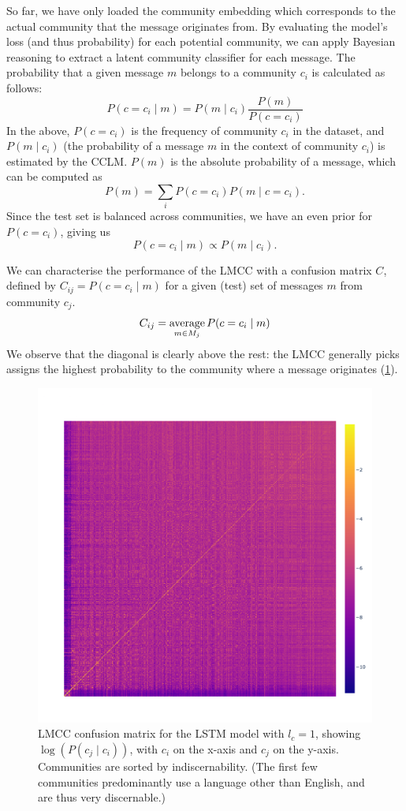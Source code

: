 \documentclass[11pt]{article}
\begin{document}
So far, we have only loaded the community embedding which corresponds
to the actual community that the message originates from. By
evaluating the model's loss (and thus probability) for each potential community,
we can apply Bayesian reasoning to extract a latent community classifier for each message.
The probability that a given message $m$
belongs to a community $c_i$ is calculated as follows:
\[P(c=c_i \mid m) = P(m \mid c_i)\frac {P(m)} {P(c=c_i)}\]
In the above,
$P(c=c_i)$ is the frequency of community $c_i$ in the dataset, and
$P(m \mid c_i)$ (the probability of a message $m$
in the context of community $c_i$) is estimated by the CCLM. 
$P(m)$ is the absolute
probability of a message, which can be computed as
\[P(m) = \sum_i P(c=c_i) P(m\mid c=c_i ). \]
Since the test set is balanced across communities,
we have an even prior for $P(c=c_i)$, giving us
\[P(c=c_i\mid m) \propto  P(m\mid c_i).\]

We can characterise the performance of the LMCC with a confusion matrix
$C$, defined by $C_{ij} = P(c=c_i \mid m)$ for a given (test) set of messages $m$ 
from community $c_j$.
\[C_{ij} = \operatorname*{average}_{m\in M_j}P(c=c_i \mid m)\]
We observe that the diagonal is clearly above the rest: the LMCC generally
picks assigns the highest probability to the community where a message originates (\cref{fig:confusion}).

\begin{figure}
  \includegraphics[width=\linewidth]{floats/confusion_lstm-3-1}
\caption{
  LMCC confusion matrix for the LSTM model with $l_c=1$, showing $\log(P(c_j\mid c_i))$, 
  with $c_i$ on the x-axis and $c_j$ on the y-axis.
  Communities are sorted by indiscernability.
  (The first few communities predominantly use a language other than English, and are thus very discernable.)}
\label{fig:confusion}
\end{figure}
\end{document}
